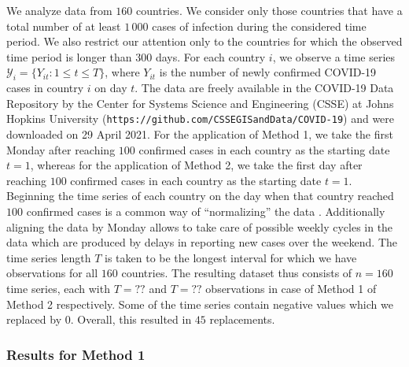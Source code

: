 \documentclass[a4paper,12pt]{article}
\numberwithin{equation}{section}
\begin{document}
We analyze data from $160$ countries. We consider only those countries that have a total number of at least $1\,000$ cases of infection during the considered time period. We also restrict our attention only to the countries for which the observed time period is longer than $300$ days. For each country $i$, we observe a time series $\mathcal{Y}_i = \{ Y_{it}: 1 \le t \le T \}$, where $Y_{it}$ is the number of newly confirmed COVID-19 cases in country $i$ on day $t$. The data are freely available in the COVID-19 Data Repository by the Center for Systems Science and Engineering (CSSE) at Johns Hopkins University (\texttt{https://github.com/CSSEGISandData/COVID-19}) and were downloaded on 29 April 2021. For the application of Method 1, we take the first Monday after reaching $100$ confirmed cases in each country as the starting date $t=1$, whereas for the application of Method 2, we take the first day after reaching $100$ confirmed cases in each country as the starting date $t=1$.
Beginning the time series of each country on the day when that country reached $100$ confirmed cases is a common way of ``normalizing'' the data \citep[see e.g.][]{Cohen2020}. Additionally aligning the data by Monday allows to take care of possible weekly cycles in the data which are produced by delays in reporting new cases over the weekend. 
The time series length $T$ is taken to be the longest interval for which we have observations for all $160$ countries. The resulting dataset thus consists of $n = 160$ time series, each with $T = ??$ and $T = ??$ observations in case of Method 1 of Method 2 respectively. Some of the time series contain negative values which we replaced by $0$. Overall, this resulted in $45$ replacements.


\subsubsection{Results for Method 1}\label{subsubsec:method1}
\end{document}
